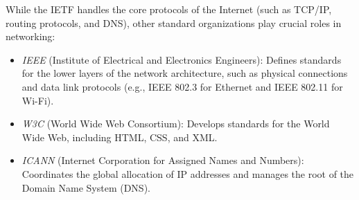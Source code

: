 While the IETF handles the core protocols of the Internet (such as TCP/IP, routing protocols, and DNS), other standard organizations play crucial roles in networking:
\begin{itemize}
    \item \emph{IEEE} (Institute of Electrical and Electronics Engineers): Defines standards for the lower layers of the network architecture, such as physical connections and data link protocols (e.g., IEEE 802.3 for Ethernet and IEEE 802.11 for Wi-Fi).
    \item \emph{W3C} (World Wide Web Consortium): Develops standards for the World Wide Web, including HTML, CSS, and XML.
    \item \emph{ICANN} (Internet Corporation for Assigned Names and Numbers): Coordinates the global allocation of IP addresses and manages the root of the Domain Name System (DNS).
\end{itemize}
